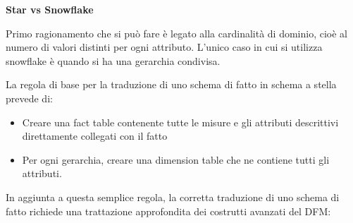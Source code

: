 \textbf{Star vs Snowflake}

Primo ragionamento che si può fare è legato alla cardinalità di dominio, cioè al numero di valori distinti per ogni attributo. L’unico caso in cui si utilizza snowflake è quando si ha una gerarchia condivisa. 

La regola di base per la traduzione di uno schema di fatto in schema a stella prevede di: 
\begin{itemize}
	\item
	Creare una fact table contenente tutte le misure e gli attributi descrittivi direttamente collegati con il fatto
	\item 
	Per ogni gerarchia, creare una dimension table che ne contiene tutti gli attributi.
\end{itemize}
In aggiunta a questa semplice regola, la corretta traduzione di uno schema di fatto richiede una trattazione approfondita dei costrutti avanzati del DFM:
